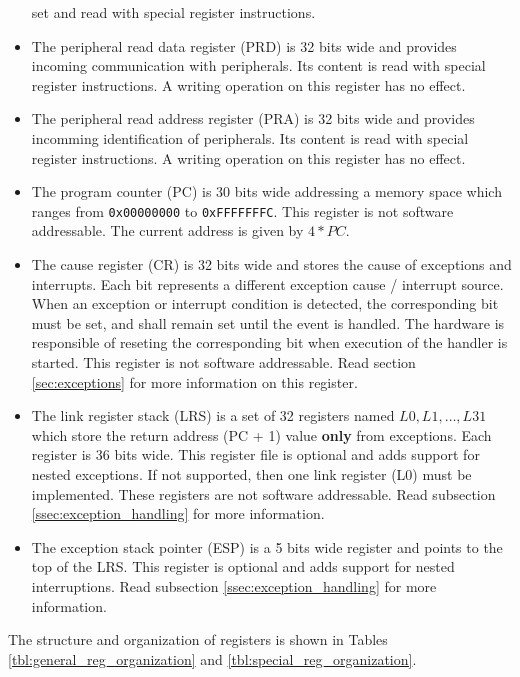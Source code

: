 \begin{itemize}
         set and read with special register instructions.
   \item The peripheral read data register (PRD) is 32 bits wide and provides incoming communication with peripherals. Its content is
         read with special register instructions. A writing operation on this register has no effect.
   \item The peripheral read address register (PRA) is 32 bits wide and provides incomming identification of peripherals. Its content is read
         with special register instructions. A writing operation on this register has no effect.
   \item The program counter (PC) is 30 bits wide addressing a memory space which ranges from \texttt{0x00000000} to \texttt{0xFFFFFFFC}.
         This register is not software addressable. The current address is given by $4*PC$.
   \item The cause register (CR) is 32 bits wide and stores the cause of exceptions and interrupts. Each bit represents a different
         exception cause / interrupt source. When an exception or interrupt condition is detected, the corresponding bit must be set, and
         shall remain set until the event is handled. The hardware is responsible of reseting the corresponding bit when execution of the
         handler is started. This register is not software addressable. Read section \ref{sec:exceptions} for more information on this register.
   \item The link register stack (LRS) is a set of 32 registers named $L0,L1,\ldots,L31$ which store the return address (PC + 1) value \textbf{only}
         from exceptions. Each register is 36 bits wide. This register file is optional and adds support for nested exceptions. If not supported,
         then one link register (L0) must be implemented. These registers are not software addressable. Read subsection \ref{ssec:exception_handling} for
         more information.
   \item The exception stack pointer (ESP) is a 5 bits wide register and points to the top of the LRS. This register is optional and adds support for
         nested interruptions. Read subsection \ref{ssec:exception_handling} for more information.
\end{itemize}

The structure and organization of registers is shown in Tables \ref{tbl:general_reg_organization} and \ref{tbl:special_reg_organization}.

